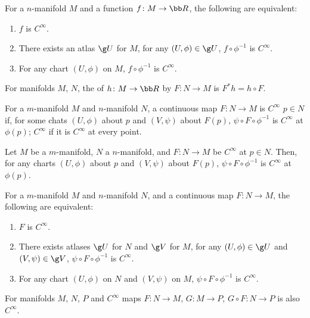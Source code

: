 For a $n$-manifold $M$ and a function $f \colon M \to \bb R$, the following are equivalent:
\begin{enumerate}
\item $f$ is $C^\infty$.
\item There exists an atlas $\g U$ for $M$, for any $(U, \phi) \in \g U$, $f \circ \phi^{-1}$ is $C^\infty$.
\item For any chart $(U,\phi)$ on $M$, $f \circ \phi^{-1}$ is $C^\infty$.
\end{enumerate}

For manifolds $M$, $N$, the  of $h \colon M \to \bb R$ by $F \colon N \to M$ is $F^* h = h \circ F$.

For a $m$-manifold $M$ and $n$-manifold $N$, a continuous map $F \colon N \to M$ is $C^\infty$  $p \in N$ if, for some chats $(U, \phi)$ about $p$ and $(V, \psi)$ about $F(p)$, $\psi \circ F \circ \phi^{-1}$ is $C^\infty$ at $\phi(p)$; $C^\infty$ if it is $C^\infty$ at every point.

Let $M$ be a $m$-manifold, $N$ a $n$-manifold, and $F \colon N \to M$ be $C^\infty$ at $p \in N$. Then, for any charts $(U, \phi)$ about $p$ and $(V,\psi)$ about $F(p)$, $\psi \circ F \circ \phi^{-1}$ is $C^\infty$ at $\phi(p)$.

For a $m$-manifold $M$ and $n$-manifold $N$, and a continuous map $F \colon N \to M$, the following are equivalent:
\begin{enumerate}
\item $F$ is $C^\infty$.
\item There exists atlases $\g U$ for $N$ and $\g V$ for $M$, for any $(U,\phi) \in \g U$ and $(V,\psi) \in \g V$, $\psi \circ F \circ \phi^{-1}$ is $C^\infty$.
\item For any chart $(U,\phi)$ on $N$ and $(V,\psi)$ on $M$, $\psi \circ F \circ \phi^{-1}$ is $C^\infty$.
\end{enumerate}

For manifolds $M$, $N$, $P$ and $C^\infty$ maps $F \colon N \to M$, $G \colon M \to P$, $G \circ F \colon N \to P$ is also $C^\infty$.

